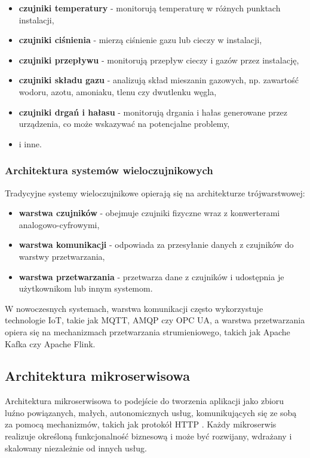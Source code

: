 \begin{itemize}
    \item \textbf{czujniki temperatury} - monitorują temperaturę w różnych punktach instalacji,
    \item \textbf{czujniki ciśnienia} - mierzą ciśnienie gazu lub cieczy w instalacji,
    \item \textbf{czujniki przepływu} - monitorują przepływ cieczy i gazów przez instalację,
    \item \textbf{czujniki składu gazu} - analizują skład mieszanin gazowych, np. zawartość wodoru, azotu, amoniaku, tlenu czy dwutlenku węgla,
    \item \textbf{czujniki drgań i hałasu} - monitorują drgania i hałas generowane przez urządzenia, co może wskazywać na potencjalne problemy,
    \item i inne.
\end{itemize}

\subsubsection{Architektura systemów wieloczujnikowych}
\label{subsubsec:architektura_systemow}

Tradycyjne systemy wieloczujnikowe opierają się na architekturze trójwarstwowej:

\begin{itemize}
    \item \textbf{warstwa czujników} - obejmuje czujniki fizyczne wraz z konwerterami analogowo-cyfrowymi,
    \item \textbf{warstwa komunikacji} - odpowiada za przesyłanie danych z czujników do warstwy przetwarzania,
    \item \textbf{warstwa przetwarzania} - przetwarza dane z czujników i udostępnia je użytkownikom lub innym systemom.
\end{itemize}

W nowoczesnych systemach, warstwa komunikacji często wykorzystuje technologie IoT, takie jak MQTT, AMQP czy OPC UA,
a warstwa przetwarzania opiera się na mechanizmach przetwarzania strumieniowego, takich jak Apache Kafka czy Apache Flink.


\subsection{Architektura mikroserwisowa}
\label{subsec:architektura_mikroserwisowa}

Architektura mikroserwisowa to podejście do tworzenia aplikacji jako zbioru luźno powiązanych, małych, autonomicznych usług,
komunikujących się ze sobą za pomocą mechanizmów, takich jak protokół HTTP \cite{microservice_architecture}.
Każdy mikroserwis realizuje określoną funkcjonalność biznesową i może być rozwijany, wdrażany i skalowany niezależnie od innych usług.

